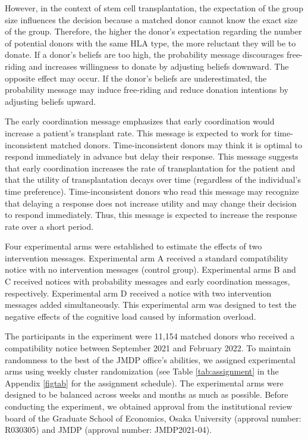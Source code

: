 \documentclass[12pt, a4paper]{article}
\begin{document}
However, in the context of stem cell transplantation, the expectation of the group size influences the decision because a matched donor cannot know the exact size of the group. Therefore, the higher the donor's expectation regarding the number of potential donors with the same HLA type, the more reluctant they will be to donate. If a donor's beliefs are too high, the probability message discourages free-riding and increases willingness to donate by adjusting beliefs downward. The opposite effect may occur. If the donor's beliefs are underestimated, the probability message may induce free-riding and reduce donation intentions by adjusting beliefs upward.

The early coordination message emphasizes that early coordination would increase a patient's transplant rate. This message is expected to work for time-inconsistent matched donors. Time-inconsistent donors may think it is optimal to respond immediately in advance but delay their response. This message suggests that early coordination increases the rate of transplantation for the patient and that the utility of transplantation decays over time (regardless of the individual's time preference). Time-inconsistent donors who read this message may recognize that delaying a response does not increase utility and may change their decision to respond immediately. Thus, this message is expected to increase the response rate over a short period.

Four experimental arms were established to estimate the effects of two intervention messages. Experimental arm A received a standard compatibility notice with no intervention messages (control group). Experimental arms B and C received notices with probability messages and early coordination messages, respectively. Experimental arm D received a notice with two intervention messages added simultaneously. This experimental arm was designed to test the negative effects of the cognitive load caused by information overload.

The participants in the experiment were 11,154 matched donors who received a compatibility notice between September 2021 and February 2022. To maintain randomness to the best of the JMDP office's abilities, we assigned experimental arms using weekly cluster randomization (see Table \ref{tab:assignment} in the Appendix \ref{figtab} for the assignment schedule). The experimental arms were designed to be balanced across weeks and months as much as possible. Before conducting the experiment, we obtained approval from the institutional review board of the Graduate School of Economics, Osaka University (approval number: R030305) and JMDP (approval number: JMDP2021-04).
\end{document}
